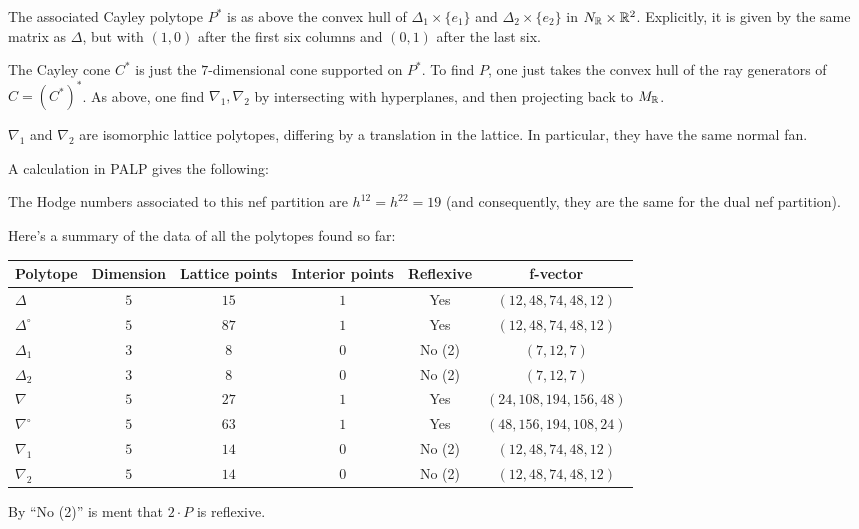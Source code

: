 \documentclass[11pt, english]{article}
\begin{document}
The associated Cayley polytope $P^\ast$ is as above the convex hull of $\Delta_1 \times \{ e_1\}$ and $\Delta_2 \times \{ e_2\} $ in $N_{\mathbb{R}} \times \mathbb{R}^2$. Explicitly, it is given by the same matrix as $\Delta$, but with $(1,0)$ after the first six columns and $(0,1)$ after the last six.

The Cayley cone $C^\ast$ is just the $7$-dimensional cone supported on $P^\ast$. To find $P$, one just takes the convex hull of the ray generators of $C=(C^\ast)^\ast$. As above, one find $\nabla_1,\nabla_2$ by intersecting with hyperplanes, and then projecting back to $M_{\mathbb{R}}$. 

\begin{lemma}
$\nabla_1$ and $\nabla_2$ are isomorphic lattice polytopes, differing by a translation in the lattice. In particular, they have the same normal fan.   
\end{lemma}

A calculation in PALP gives the following:
\begin{lemma}
The Hodge numbers associated to this nef partition are $h^{12}=h^{22}=19$ (and consequently, they are the same for the dual nef partition).
\end{lemma}

Here's a summary of the data of all the polytopes found so far:


\begin{center}
  \begin{tabular}{l| c c c c c}
Polytope & Dimension & Lattice points & Interior points & Reflexive & f-vector \\
\hline 
$\Delta$ & $5$ & $15$ & $1$ & Yes & $(12, 48, 74, 48, 12)$ \\
$\Delta^\circ$ & $5$ & $87$ & $1$ & Yes & $(12, 48, 74, 48, 12)$ \\
$\Delta_1$ & $3$ & $8$ & $0$ & No (2) & $(7, 12, 7)$ \\
$\Delta_2$ & $3$ & $8$ & $0$ & No (2) & $(7, 12, 7)$ \\
$\nabla$ & $5$ & $27$ & $1$ & Yes & $(24, 108, 194, 156, 48)$ \\
$\nabla^\circ$ & $5$ & $63$ & $1$ & Yes & $(48, 156, 194, 108, 24)$ \\
$\nabla_1$ & $5$ & $14$ & $0$ & No (2)& $(12, 48, 74, 48, 12)$ \\
$\nabla_2$ & $5$ & $14$ & $0$ & No (2)& $(12, 48, 74, 48, 12)$ \\
\end{tabular} 
\end{center} 
By ``No (2)'' is ment that $2 \cdot P$ is reflexive. 
\end{document}
